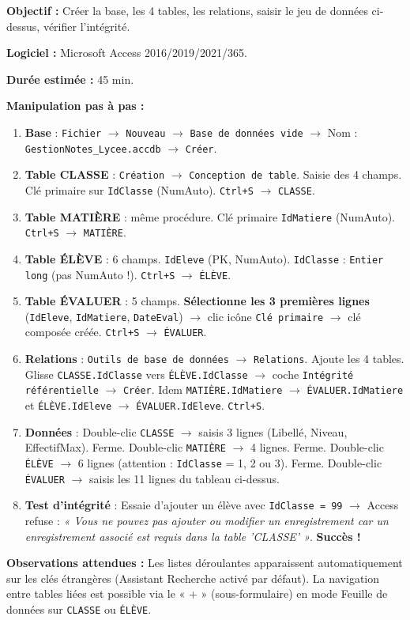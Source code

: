 \documentclass[11pt]{article}
\begin{document}
\begin{experience}
\textbf{Objectif :} Créer la base, les 4 tables, les relations, saisir le jeu de données ci-dessus, vérifier l'intégrité.\par
\textbf{Logiciel :} Microsoft Access 2016/2019/2021/365.\par
\textbf{Durée estimée :} 45 min.\par
\vspace{0.2cm}
\textbf{Manipulation pas à pas :}
\begin{enumerate}
    \item \textbf{Base} : \texttt{Fichier} $\to$ \texttt{Nouveau} $\to$ \texttt{Base de données vide} $\to$ Nom : \texttt{GestionNotes\_Lycee.accdb} $\to$ \texttt{Créer}.
    \item \textbf{Table CLASSE} : \texttt{Création} $\to$ \texttt{Conception de table}. Saisie des 4 champs. Clé primaire sur \texttt{IdClasse} (NumAuto). \texttt{Ctrl+S} $\to$ \texttt{CLASSE}.
    \item \textbf{Table MATIÈRE} : même procédure. Clé primaire \texttt{IdMatiere} (NumAuto). \texttt{Ctrl+S} $\to$ \texttt{MATIÈRE}.
    \item \textbf{Table ÉLÈVE} : 6 champs. \texttt{IdEleve} (PK, NumAuto). \texttt{IdClasse} : \texttt{Entier long} (pas NumAuto !). \texttt{Ctrl+S} $\to$ \texttt{ÉLÈVE}.
    \item \textbf{Table ÉVALUER} : 5 champs. \textbf{Sélectionne les 3 premières lignes} (\texttt{IdEleve}, \texttt{IdMatiere}, \texttt{DateEval}) $\to$ clic icône \texttt{Clé primaire} $\to$ clé composée créée. \texttt{Ctrl+S} $\to$ \texttt{ÉVALUER}.
    \item \textbf{Relations} : \texttt{Outils de base de données} $\to$ \texttt{Relations}. Ajoute les 4 tables. Glisse \texttt{CLASSE.IdClasse} vers \texttt{ÉLÈVE.IdClasse} $\to$ coche \texttt{Intégrité référentielle} $\to$ \texttt{Créer}. Idem \texttt{MATIÈRE.IdMatiere} $\to$ \texttt{ÉVALUER.IdMatiere} et \texttt{ÉLÈVE.IdEleve} $\to$ \texttt{ÉVALUER.IdEleve}. \texttt{Ctrl+S}.
    \item \textbf{Données} : Double-clic \texttt{CLASSE} $\to$ saisis 3 lignes (Libellé, Niveau, EffectifMax). Ferme. Double-clic \texttt{MATIÈRE} $\to$ 4 lignes. Ferme. Double-clic \texttt{ÉLÈVE} $\to$ 6 lignes (attention : \texttt{IdClasse} = 1, 2 ou 3). Ferme. Double-clic \texttt{ÉVALUER} $\to$ saisis les 11 lignes du tableau ci-dessus.
    \item \textbf{Test d'intégrité} : Essaie d'ajouter un élève avec \texttt{IdClasse = 99} $\to$ Access refuse : \emph{« Vous ne pouvez pas ajouter ou modifier un enregistrement car un enregistrement associé est requis dans la table 'CLASSE' »}. \textbf{Succès !}
\end{enumerate}
\textbf{Observations attendues :} Les listes déroulantes apparaissent automatiquement sur les clés étrangères (Assistant Recherche activé par défaut). La navigation entre tables liées est possible via le « + » (sous-formulaire) en mode Feuille de données sur \texttt{CLASSE} ou \texttt{ÉLÈVE}.
\end{experience}
\end{document}
